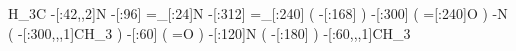               H_3C%
     -[:42,,2]N%
        -[:96]%
       =_[:24]N%
       -[:312]%
      =_[:240]%
                 (
           -[:168]\phantom{N}%
                 )
       -[:300]%
                 (
           =[:240]O%
                 )
             -N%
                 (
       -[:300,,,1]CH_3%
                 )
        -[:60]%
                 (
                 =O%
                 )
       -[:120]N%
                 (
           -[:180]%
                 )
    -[:60,,,1]CH_3%